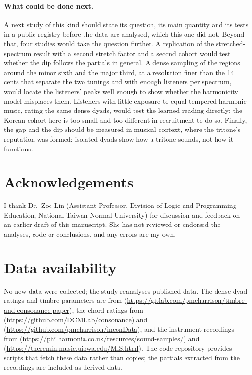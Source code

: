 \documentclass[11pt,a4paper]{article}
\begin{document}
\paragraph{What could be done next.}
A next study of this kind should state its question, its main quantity and its tests in a
public registry before the data are analysed, which this one did not. Beyond that,
four studies would take the question further. A replication of the stretched-spectrum result
with a second stretch factor and a second cohort would test whether the dip follows the
partials in general. A dense sampling of the regions around the minor sixth and the major
third, at a resolution finer than the 14 cents that separate the two tunings and with enough
listeners per spectrum, would locate the listeners' peaks well enough to show whether the
harmonicity model misplaces them. Listeners with little exposure to equal-tempered harmonic
music, rating the same dense dyads, would test the learned reading directly; the Korean
cohort here is too small and too different in recruitment to do so. Finally, the gap and the
dip should be measured in musical context, where the tritone's reputation was formed:
isolated dyads show how a tritone sounds, not how it functions.

\section*{Acknowledgements}
I thank Dr.~Zoe Lin (Assistant Professor, Division of Logic and Programming Education,
National Taiwan Normal University) for discussion and feedback on an earlier draft of this
manuscript. She has not reviewed or endorsed the analyses, code or conclusions, and any errors
are my own.

\section*{Data availability}
No new data were collected; the study reanalyses published data. The dense dyad ratings and
timbre parameters are from \citet{marjieh2024code}
(\url{https://gitlab.com/pmcharrison/timbre-and-consonance-paper}), the chord ratings from
\citet{dcmlab} (\url{https://github.com/DCMLab/consonance}) and \citet{incondata}
(\url{https://github.com/pmcharrison/inconData}), and the instrument recordings from
\citet{philharmonia} (\url{https://philharmonia.co.uk/resources/sound-samples/}) and
\citet{iowamis} (\url{https://theremin.music.uiowa.edu/MIS.html}). The code repository provides
scripts that fetch these data rather than copies; the partials extracted from the recordings are
included as derived data.
\end{document}
